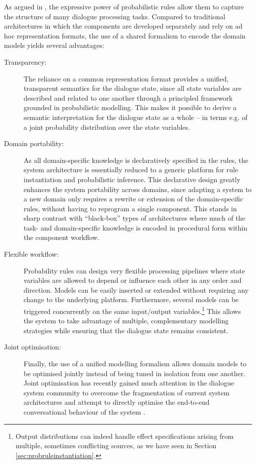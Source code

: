 As argued in \cite{lison-semdial2012}, the expressive power of probabilistic rules allow them to capture the structure of many dialogue processing tasks.  Compared to traditional architectures in which the components are developed separately and rely on ad hoc representation formats, the use of a shared formalism to encode the domain models yields several advantages:
\begin{description}
\item [Transparency: ] The reliance on a common representation format provides a unified, transparent semantics for the dialogue state, since all state variables are described and related to one another through a principled framework grounded in probabilistic modelling.  This makes it possible to derive a semantic interpretation for the dialogue state as a whole -- in terms e.g. of a joint probability distribution over the state variables. 

\item [Domain portability: ]  As all domain-specific knowledge is declaratively specified in the rules, the system architecture is essentially reduced to a generic platform for rule instantiation and probabilistic inference.  This declarative design greatly enhances the system portability across domains, since adapting a system to a new domain only requires a rewrite or extension of the domain-specific rules, without having to reprogram a single component.  This stands in sharp contrast with ``black-box'' types of architectures where much of the task- and domain-specific knowledge is encoded in procedural form within the component workflow.

\item [Flexible workflow: ] Probability rules can design very flexible processing pipelines where state variables are allowed to depend or influence each other in any order and direction.  Models can be easily inserted or extended without requiring any change to the underlying platform. Furthermore, several models can be triggered concurrently on the same input/output variables.\footnote{Output distributions can indeed handle effect specifications arising from multiple, sometimes conflicting sources, as we have seen in Section \ref{sec:probruleinstantiation}.} This allows the system to take advantage of multiple, complementary modelling strategies while ensuring that the dialogue state remains consistent. 

\item [Joint optimisation: ] Finally, the use of a unified modelling formalism allows domain models to be optimised jointly instead of being tuned in isolation from one another. Joint optimisation has recently gained much attention in the dialogue system community to overcome the fragmentation of current system architectures and attempt to directly optimise the end-to-end conversational behaviour of the system \citep{Lemon:2011}. 

\end{description}

